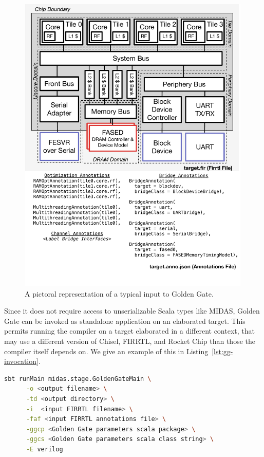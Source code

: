 \begin{figure}
    \centering
    \includegraphics[width=0.99\textwidth]{figures/gg-target.pdf}
    \caption{A pictoral representation of a typical input to Golden Gate.}
    \label{fig:gg-target}
\end{figure}

Since it does not require access to unserializable Scala
types like MIDAS, Golden Gate can be invoked as standalone application on an
elaborated target. This permits running the
compiler on a target elaborated in a different context, that may use a
different version of Chisel, FIRRTL, and Rocket Chip than those the compiler
itself depends on.  We give an example of this in Listing~\ref{lst:gg-invocation}.

\begin{lstlisting}[style=shell, language=bash, label={lst:gg-invocation}, caption=An example command-line invocation of Golden Gate.]
  sbt runMain midas.stage.GoldenGateMain \
      -o <output filename> \
      -td <output directory> \
      -i  <input FIRRTL filename> \
      -faf <input FIRRTL annotations file> \
      -ggcp <Golden Gate parameters scala package> \
      -ggcs <Golden Gate parameters scala class string> \
      -E verilog
\end{lstlisting}

